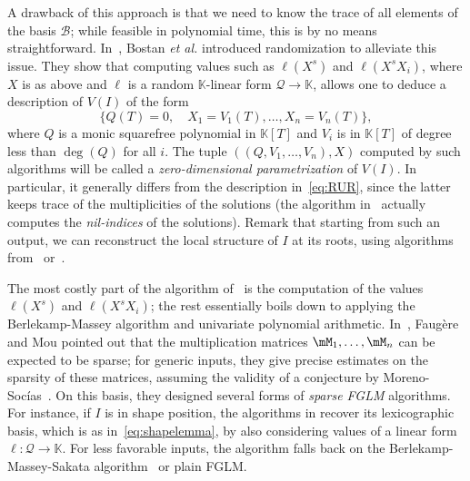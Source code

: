 \documentclass[12pt]{article}
\newcommand{\basis}{\mathscr{B}}
\newcommand{\lf}{X}
\newcommand{\residueI}{\mathscr{Q}}
\newcommand{\sqfree}{Q}
\def\K{\mathbb{K}}
\def\K {\ensuremath{\mathbb{K}}}
\begin{document}
A drawback of this approach is that we need to know the trace of all
elements of the basis $\basis$; while feasible in polynomial time,
this is by no means straightforward. In~\cite{BoSaSc03}, Bostan {\it
  et al.} introduced randomization to alleviate this issue. They show
that computing values such as $\ell(\lf^s)$ and $\ell(\lf^s X_i)$, where
$\lf$ is as above and 
$\ell$ is a random $\K$-linear form $\residueI \to \K$, allows one to deduce
a description of $V(I)$ of the form
\begin{equation}\label{eq:BoSaSc03}
 \{  \sqfree(T)=0, \quad X_1 = V_1(T), \dots,X_n = V_n(T) \},
\end{equation}
where $\sqfree$ is a monic squarefree polynomial in $\K[T]$ and $V_i$ is in
$\K[T]$ of degree less than $\deg(\sqfree)$ for all $i$. The tuple
 $((\sqfree,V_1,\dots,V_n),\lf)$ computed by  such algorithms
will be called a {\em zero-dimensional parametrization} of $V(I)$. In
particular, it generally differs from the description
in~\cref{eq:RUR}, since the latter keeps trace of the multiplicities
of the solutions (the algorithm in~\cite{BoSaSc03} actually computes
the {\em nil-indices} of the solutions). Remark that starting from
such an output, we can reconstruct the local structure of $I$ at 
its roots, using algorithms from~\cite{MaMoMo96} or~\cite{NeRaSc17}.

The most costly part of the algorithm of~\cite{BoSaSc03} is the
computation of the values $\ell(\lf^s)$ and $\ell(\lf^s X_i)$; the
rest essentially boils down to applying the Berlekamp-Massey algorithm
and univariate polynomial arithmetic. In~\cite{FaMo17}, Faug{\`e}re
and Mou pointed out that the multiplication matrices
$\mM_1,\dots,\mM_n$ can be expected to be sparse; for generic inputs,
they give precise estimates on the sparsity of these matrices,
assuming the validity of a conjecture by
Moreno-Soc\'ias~\cite{MorenoSocias91}.  On this basis, they designed
several forms of {\em sparse FGLM} algorithms. For instance, if $I$ is
in shape position, the algorithms in \cite{FaMo17} recover its
lexicographic basis, which is as in~\eqref{eq:shapelemma}, by also
considering values of a linear form $\ell:\residueI \to \K$. For less
favorable inputs, the algorithm falls back on the
Berlekamp-Massey-Sakata algorithm~\cite{Sakata90} or plain FGLM.
\end{document}
